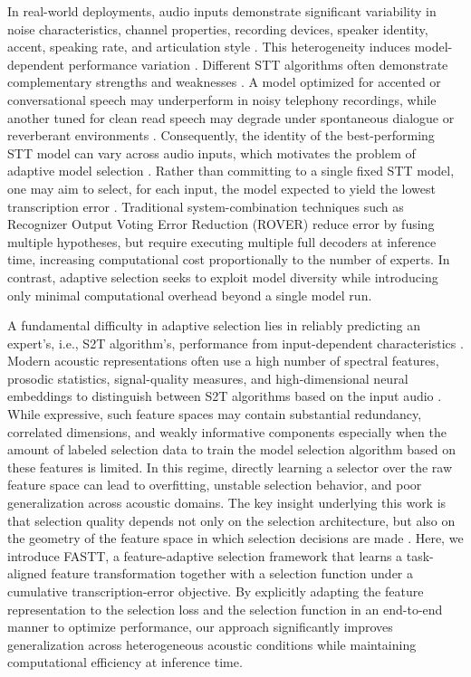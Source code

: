\documentclass[journal]{IEEEtran}
\begin{document}
    In real-world deployments, audio inputs demonstrate significant variability in
    noise characteristics, channel properties, recording devices, speaker
    identity, accent, speaking rate, and articulation style \cite{cornell_chi,watanabe2020_chime6}.
    This heterogeneity induces model-dependent performance variation \cite{hanzhuboosting,cornell_chi}. Different STT
    algorithms often demonstrate complementary strengths and weaknesses  \cite{audhkhasi,gales}. A model
    optimized for accented or conversational speech may underperform in noisy
    telephony recordings, while another tuned for clean read speech may degrade under
    spontaneous dialogue or reverberant environments \cite{watanabe2020_chime6,gamper}.
    Consequently, the identity of the best-performing STT model can vary across audio
    inputs, which motivates the problem of adaptive model selection \cite{rice1976algorithm,vanschoren,vettoruzzo}. Rather than committing to a
    single fixed STT model, one may aim to select, for each input, the model
    expected to yield the lowest transcription error \cite{gamper,vanschoren,ragni}. Traditional system-combination
    techniques such as Recognizer
    Output Voting Error Reduction (ROVER) \cite{audhkhasi,fiscus1997rover,yang_system} reduce error by fusing multiple
    hypotheses, but require executing multiple full decoders at inference time, increasing
    computational cost proportionally to the number of experts. In contrast, adaptive
    selection seeks to exploit model diversity while introducing only minimal computational
    overhead beyond a single model run.

    A fundamental difficulty in adaptive selection lies in reliably predicting an expert's, i.e., S2T algorithm's, performance from input-dependent characteristics \cite{gamper,ragni,kastanos}. Modern acoustic representations often use a high number of spectral features, prosodic statistics,
    signal-quality measures, and high-dimensional neural embeddings to distinguish between S2T algorithms based on the input audio \cite{gamper,zezario, chen2022_wavlm}.
    While expressive, such feature spaces may contain substantial redundancy,
    correlated dimensions, and weakly informative components especially when the amount of labeled selection data to train the model selection algorithm based on these features is limited. In this regime, directly learning a selector over the raw feature space can lead to overfitting, unstable
    selection behavior, and poor generalization across acoustic domains. The key insight underlying this work is that selection quality depends not only on the selection architecture, but also on the geometry of the feature space in
    which selection decisions are made \cite{zezario,deep_featurespace}. Here, we introduce FASTT, a feature-adaptive
    selection framework that learns a task-aligned feature transformation
    together with a selection function under a cumulative transcription-error
    objective. By explicitly adapting the feature representation to the selection loss and the selection function in an end-to-end manner to optimize performance, our approach significantly improves generalization across heterogeneous acoustic conditions while maintaining computational efficiency at inference time.
\end{document}

